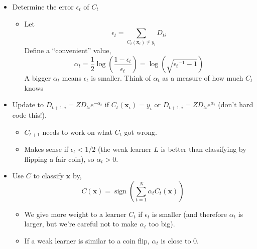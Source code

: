 \documentclass[12pt]{article}
\DeclareMathOperator{\sgnn}{sign}
\begin{document}
\begin{itemize}
\item Determine the error $\epsilon_t$ of $C_t$
\begin{itemize}
\item Let
\[
\epsilon_t = \sum_{C_t \left(\mathbf{x}_i\right) \neq y_i} D_{t i}
\]
Define a ``convenient'' value,
\[
\alpha_t = \frac{1}{2} \log \left( \frac{1 - \epsilon_t}{\epsilon_t} \right) = \log \left(\sqrt{{\epsilon_t}^{-1} - 1}\right)
\]
A bigger $\alpha_t$ means $\epsilon_t$ is smaller. Think of $\alpha_t$ as a measure of how much $C_t$ knows
\end{itemize}
\item Update to $D_{t + 1, i} = Z D_{t i} e^{-\alpha_t}$ if $C_t(\mathbf{x}_i) = y_i$ or $D_{t + 1, i} = Z D_{t i} e^{\alpha_t}$ (don't hard code this!).
\begin{itemize}
\item $C_{t + 1}$ needs to work on what $C_t$ got wrong.
\item Makes sense if $\epsilon_t < 1/2$ (the weak learner $L$ is better than classifying by flipping a fair coin), so $\alpha_t > 0$.
\end{itemize}
\item Use $C$ to classify $\mathbf{x}$ by,
\[
C(\mathbf{x}) = \sgnn \left(\sum_{t = 1}^N \alpha_t C_t (\mathbf{x}) \right)
\]
\begin{itemize}
\item We give more weight to a learner $C_t$ if $\epsilon_t$ is smaller (and therefore $\alpha_t$ is larger, but we're careful not to make $\alpha_t$ too big).
\item If a weak learner is similar to a coin flip, $\alpha_t$ is close to $0$.
\end{itemize}
\end{itemize}
\end{document}
